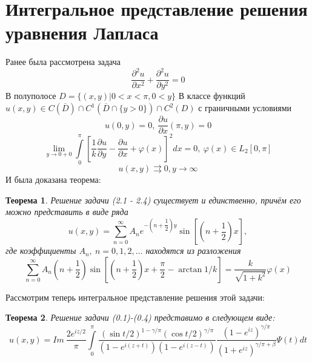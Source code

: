 \documentclass[12pt, a4paper]{extarticle}
\newtheorem{theorem}{Теорема}
\numberwithin{equation}{section}
\numberwithin{lemma}{section}
\numberwithin{definition}{section}
\numberwithin{notabene}{section}
\numberwithin{corollary}{section}
\begin{document}
	\section*{Интегральное представление решения уравнения Лапласа}
	Ранее была рассмотрена задача
	\begin{equation}
		\dfrac{\partial^2 u}{\partial x^2} +\dfrac{\partial^2 u}{\partial y^2} = 0
	\end{equation}
	В полуполосе $D = \{(x,y) \vert 0 < x < \pi, 0 < y\}$\newline
	В классе функций $u(x,y) \in C(\overline{D}) \cap C^1(\overline{D} \cap \{y > 0\}) \cap C^2 (D)$ \newline
	с граничными условиями
	\begin{equation}
		u(0, y) = 0, \ \dfrac{\partial u}{\partial x} (\pi, y) = 0
	\end{equation}
	\begin{equation}
		\lim\limits_{y \to 0 + 0} \int\limits_0^\pi \left[\dfrac{1}{k}\dfrac{\partial u}{\partial y} - \dfrac{\partial u}{\partial x} + \varphi(x) \right]^2 dx = 0, \ \varphi(x) \in L_2[0,\pi]
	\end{equation}
	\begin{equation}
		u(x,y) \rightrightarrows 0, y \to \infty
	\end{equation}
	И была доказана теорема:
	\begin{theorem}
		Решение задачи (2.1 - 2.4) существует и единственно, причём его можно представить в виде ряда
		\begin{equation}
			u(x,y) = \sum\limits_{n=0}^{\infty} A_n e^{-\left(n + \dfrac12\right)y} \sin{\left[\left(n + \dfrac12\right)x\right]},
		\end{equation}
		где коэффициенты $A_n, \ n =0,1,2, \dots$ находятся из разложения
		\begin{equation}
			\sum\limits_{n=0}^{\infty} A_n \left(n + \dfrac12 \right) \sin{\left[\left(n +\dfrac12\right)x + \dfrac\pi2 - \arctan{1/k} \right]} = \dfrac{k}{\sqrt{1+k^2}} \varphi(x)
		\end{equation}
	\end{theorem}
	\newpage
	Рассмотрим теперь интегральное представление решения этой задачи:
	\begin{theorem}
		Решение задачи (0.1)-(0.4) представимо в следующем виде:
		\begin{equation}
			u(x,y) = Im \ \dfrac{2e^{iz/2}}{\pi} \int\limits_0^\pi  \dfrac{\left(\sin{t/2}\right)^{1 - \gamma/\pi} \left(\cos{t/2}\right)^{\gamma/\pi}}{\left(1 - e^{i(z+t)} \right) \left(1 - e^{i(z-t)}\right)} \dfrac{\left(1 - e^{iz}\right)^{\gamma/\pi}}{\left(1 + e^{iz}\right)^{\gamma/\pi + \beta}} \Psi(t) dt
		\end{equation}	
	\end{theorem}	
\end{document}
